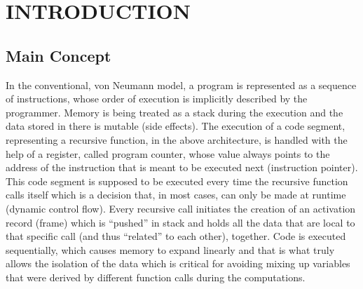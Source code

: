 \documentclass[ack,preface]{dithesis}
\begin{document}
\frontmatter

\mainmatter

\chapter{INTRODUCTION}
    \section{Main Concept}
	In the conventional, von Neumann model, a program is represented as a sequence of instructions, whose order of execution is implicitly described by the programmer. Memory is being treated as a stack during the execution and the data stored in there is mutable (side effects). The execution of a code segment, representing a recursive function, in the above architecture, is handled with the help of a register, called program counter, whose value always points to the address of the instruction that is meant to be executed next (instruction pointer). This code segment is supposed to be executed every time the recursive function calls itself which is a decision that, in most cases, can only be made at runtime (dynamic control flow). Every recursive call initiates the creation of an activation record (frame) which is “pushed” in stack and holds all the data that are local to that specific call (and thus “related” to each other), together. Code is executed sequentially, which causes memory to expand linearly and that is what truly allows the isolation of the data which is critical for avoiding mixing up variables that were derived by different function calls during the computations.
\end{document}
